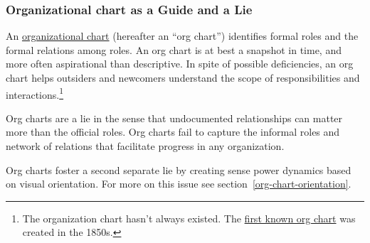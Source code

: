 \subsubsection*{Organizational chart as a Guide and a Lie}

An \href{https://en.wikipedia.org/wiki/Organizational_chart}{organizational chart} (hereafter an ``org chart'') identifies formal roles and the formal relations among roles. An org chart is at best a snapshot in time, and more often aspirational than descriptive. In spite of possible deficiencies, an org chart helps outsiders and newcomers understand the scope of responsibilities and interactions.\footnote{The organization chart hasn't always existed. The \href{https://en.wikipedia.org/wiki/George_Holt_Henshaw\#First_organization_chart}{first known org chart} was created in the 1850s.}

Org charts are a lie in the sense that undocumented relationships can matter more than the official roles. Org charts fail to capture the informal roles and network of relations that facilitate progress in any organization. 

Org charts foster a second separate lie by creating sense power dynamics based on visual orientation. For more on this issue see section~\ref{org-chart-orientation}.
